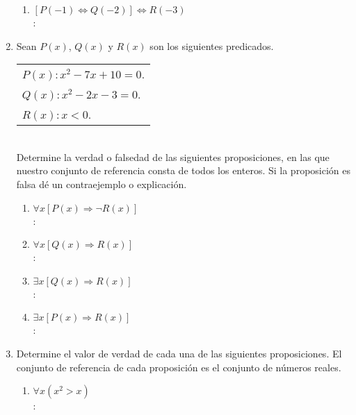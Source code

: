 \begin{enumerate}[label=0.1.\arabic*]
\begin{enumerate}[label=\arabic*)]
		\item $ [P(-1) \Leftrightarrow Q(-2)] \Leftrightarrow R(-3) $ \\
		\solucion: \\
	\end{enumerate}

	\item Sean $ P(x) $, $ Q(x) $ y $ R(x) $ son los siguientes predicados. \\
	\begin{tabular}{l}
		$ P(x): x^2 - 7x + 10 = 0 $. \\
		$ Q(x): x^2 - 2x - 3 = 0 $. \\
		$ R(x): x < 0  $.
	\end{tabular} \\
	Determine la verdad o falsedad de las siguientes proposiciones, en las que nuestro conjunto de referencia  consta de todos los enteros. Si la proposición es falsa dé un contraejemplo o explicación.
	\begin{enumerate}[label=\arabic*)]
		\item $ \forall x [P(x) \Rightarrow \neg R(x)] $ \\
		\solucion: \\
		
		\item $ \forall x [Q(x) \Rightarrow R(x)] $ \\
		\solucion: \\
		
		\item $ \exists x [Q(x) \Rightarrow R(x)] $ \\
		\solucion: \\
		
		\item $ \exists x [P(x) \Rightarrow R(x)] $ \\
		\solucion: \\
		
	\end{enumerate}

	\item Determine el valor de verdad de cada una  de las siguientes proposiciones. El conjunto de referencia de cada proposición  es el conjunto de números reales.
	\begin{enumerate}[label=\arabic*)]
		\item $ \forall x (x^2 > x) $ \\
		\solucion: \\
		

\end{enumerate}
\end{enumerate}
